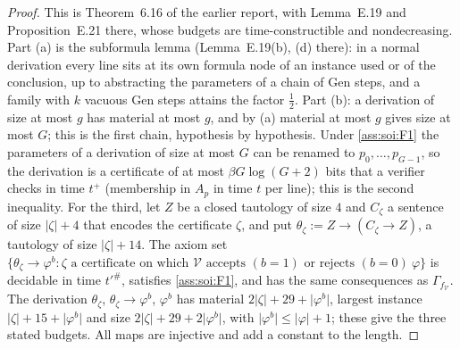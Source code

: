 \begin{proof}
This is Theorem~6.16 of the earlier report, with Lemma~E.19 and Proposition~E.21 there, whose budgets are time-constructible and nondecreasing. Part (a) is the subformula lemma (Lemma~E.19(b), (d) there): in a normal derivation every line sits at its own formula node of an instance used or of the conclusion, up to abstracting the parameters of a chain of Gen steps, and a family with $k$ vacuous Gen steps attains the factor $\frac12$. Part (b): a derivation of size at most $g$ has material at most $g$, and by (a) material at most $g$ gives size at most $G$; this is the first chain, hypothesis by hypothesis. Under \cref{ass:soi:F1} the parameters of a derivation of size at most $G$ can be renamed to $p_0,\dots,p_{G-1}$, so the derivation is a certificate of at most $\beta G\log(G+2)$ bits that a verifier checks in time $t^+$ (membership in $A_p$ in time $t$ per line); this is the second inequality. For the third, let $Z$ be a closed tautology of size $4$ and $C_\zeta$ a sentence of size $\lvert\zeta\rvert+4$ that encodes the certificate $\zeta$, and put $\theta_\zeta:=Z\to(C_\zeta\to Z)$, a tautology of size $\lvert\zeta\rvert+14$. The axiom set $\{\theta_\zeta\to\varphi^b:\zeta\text{ a certificate on which }\mathcal V\text{ accepts }(b=1)\text{ or rejects }(b=0)\ \varphi\}$ is decidable in time $t'^\#$, satisfies \cref{ass:soi:F1}, and has the same consequences as $\Gamma_{f_{\mathcal V}}$. The derivation $\theta_\zeta$, $\theta_\zeta\to\varphi^b$, $\varphi^b$ has material $2\lvert\zeta\rvert+29+\lvert\varphi^b\rvert$, largest instance $\lvert\zeta\rvert+15+\lvert\varphi^b\rvert$ and size $2\lvert\zeta\rvert+29+2\lvert\varphi^b\rvert$, with $\lvert\varphi^b\rvert\le\lvert\varphi\rvert+1$; these give the three stated budgets. All maps are injective and add a constant to the length.
\end{proof}

